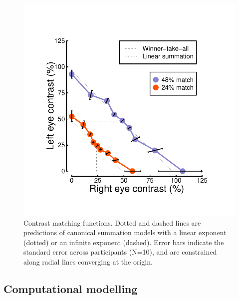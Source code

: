 \documentclass[
]{article}
\begin{document}
\begin{figure}

{\centering \includegraphics{Figures/matchingdata} 

}

\caption{Contrast matching functions. Dotted and dashed lines are predictions of canonical summation models with a linear exponent (dotted) or an infinite exponent (dashed). Error bars indicate the standard error across participants (N=10), and are constrained along radial lines converging at the origin.}\label{fig:matchingdata}
\end{figure}

\hypertarget{computational-modelling}{%
\subsection{Computational modelling}\label{computational-modelling}}
\end{document}
